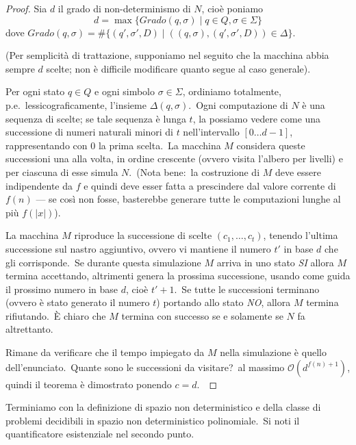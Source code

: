 \begin{proof}

    Sia $d$ il grado di non-determinismo di $N$, cioè poniamo
    \[d = \max \{\mathit{Grado}(q,\sigma) \mid q \in Q, \sigma \in \Sigma\}\]
    dove $Grado(q, \sigma) = \#\{(q',\sigma',D) \mid ((q,\sigma),(q',\sigma',D)) \in \Delta\}$.\

    \medskip
    \noindent(Per semplicità di trattazione, supponiamo nel seguito che la macchina abbia sempre $d$ scelte; non è difficile modificare quanto segue al caso generale).
    \medskip

    \noindent Per ogni stato $q \in Q$ e ogni simbolo $\sigma \in \Sigma$, ordiniamo totalmente, p.e.\ lessicograficamente, l'insieme $\Delta (q, \sigma)$.\
    Ogni computazione di $N$ è una sequenza di scelte; se tale sequenza è lunga $t$, la possiamo vedere come una successione di numeri naturali minori di $t$ nell'intervallo $[0 \dots d - 1]$, rappresentando con 0 la prima scelta.\
    La macchina $M$ considera queste successioni una alla volta, in ordine crescente (ovvero visita l'albero per livelli) e per ciascuna di esse simula $N$.\
    (Nota bene:\ la costruzione di $M$ deve essere indipendente da $f$ e quindi deve esser fatta a prescindere dal valore corrente di $f(n)$ --- se così non fosse, basterebbe generare tutte le computazioni lunghe al più $f(|x|)$).

    La macchina $M$ riproduce la successione di scelte $(c_1 , \dots, c_t )$, tenendo l'ultima successione sul nastro aggiuntivo, ovvero vi mantiene il numero $t'$ in base $d$ che gli corrisponde.\
    Se durante questa simulazione $M$ arriva in uno stato \textit{\footnotesize SI} allora $M$ termina accettando, altrimenti genera la prossima successione, usando come guida il prossimo numero in base $d$, cioè $t' + 1$.\
    Se tutte le successioni terminano (ovvero è stato generato il numero $t$) portando allo stato \textit{\footnotesize NO}, allora $M$ termina rifiutando.\
    È chiaro che $M$ termina con successo se e solamente se $N$ fa altrettanto.\

    Rimane da verificare che il tempo impiegato da $M$ nella simulazione è quello dell'enunciato.\
    Quante sono le successioni da visitare?\ al massimo $\mathcal{O}\left(d^{f(n)+1}\right)$, quindi il teorema è dimostrato ponendo $c = d$.\

\end{proof}

\noindent Terminiamo con la definizione di spazio non deterministico e della classe di problemi decidibili in spazio non deterministico polinomiale.\
Si noti il quantificatore esistenziale nel secondo punto.

